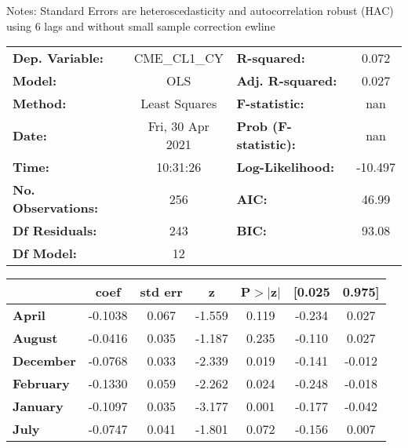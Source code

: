 Notes: \newline
 [1] Standard Errors are heteroscedasticity and autocorrelation robust (HAC) using 6 lags and without small sample correction
ewline\begin{center}
\begin{tabular}{lclc}
\toprule
\textbf{Dep. Variable:}    &   CME\_CL1\_CY   & \textbf{  R-squared:         } &     0.072   \\
\textbf{Model:}            &       OLS        & \textbf{  Adj. R-squared:    } &     0.027   \\
\textbf{Method:}           &  Least Squares   & \textbf{  F-statistic:       } &       nan   \\
\textbf{Date:}             & Fri, 30 Apr 2021 & \textbf{  Prob (F-statistic):} &      nan    \\
\textbf{Time:}             &     10:31:26     & \textbf{  Log-Likelihood:    } &   -10.497   \\
\textbf{No. Observations:} &         256      & \textbf{  AIC:               } &     46.99   \\
\textbf{Df Residuals:}     &         243      & \textbf{  BIC:               } &     93.08   \\
\textbf{Df Model:}         &          12      & \textbf{                     } &             \\
\bottomrule
\end{tabular}
\begin{tabular}{lcccccc}
                   & \textbf{coef} & \textbf{std err} & \textbf{z} & \textbf{P$> |$z$|$} & \textbf{[0.025} & \textbf{0.975]}  \\
\midrule
\textbf{April}     &      -0.1038  &        0.067     &    -1.559  &         0.119        &       -0.234    &        0.027     \\
\textbf{August}    &      -0.0416  &        0.035     &    -1.187  &         0.235        &       -0.110    &        0.027     \\
\textbf{December}  &      -0.0768  &        0.033     &    -2.339  &         0.019        &       -0.141    &       -0.012     \\
\textbf{February}  &      -0.1330  &        0.059     &    -2.262  &         0.024        &       -0.248    &       -0.018     \\
\textbf{January}   &      -0.1097  &        0.035     &    -3.177  &         0.001        &       -0.177    &       -0.042     \\
\textbf{July}      &      -0.0747  &        0.041     &    -1.801  &         0.072        &       -0.156    &        0.007     \\

\end{tabular}
\end{center}
